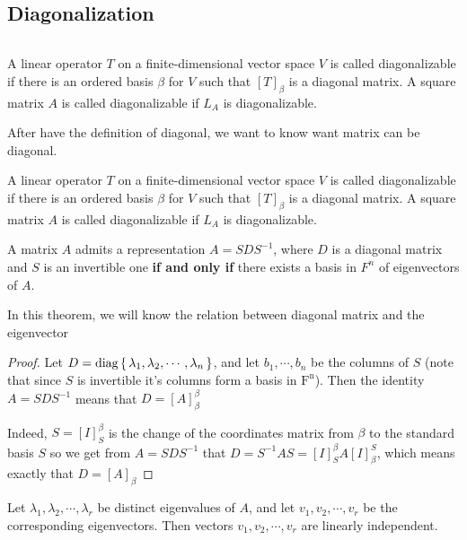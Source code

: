 \subsection{Diagonalization} $ $

\begin{defn}
	A linear operator $T$ on a finite-dimensional vector space $V$ is called diagonalizable if there is an ordered basis $\beta$ for $V$ such that $[T]_\beta$ is a diagonal matrix. A square matrix $A$ is called diagonalizable if $L_A$ is diagonalizable.
\end{defn}

\begin{tcolorbox}
	After have the definition of diagonal, we want to know want matrix can be diagonal.
\end{tcolorbox}



\begin{defn}
	A linear operator $T$ on a finite-dimensional vector space $V$ is called diagonalizable if there is an ordered basis $\beta$ for $V$ such that $[T]_{\beta}$ is a diagonal matrix. A square matrix $A$ is called diagonalizable if $L_A$ is diagonalizable.
\end{defn}

\begin{thm*}
	A matrix $A$ admits a representation $A = SDS^{-1}$, where $D$ is a diagonal matrix and $S$ is an invertible one \textbf{if and only if} there exists a basis in $F^n$ of eigenvectors of $A$.
\end{thm*}

\begin{tcolorbox}
	In this theorem, we will know the relation between diagonal matrix and the eigenvector
\end{tcolorbox}

\begin{proof}
	Let $D = \text{diag}\left\{ \,\lambda_1,\lambda_2,\cdots,\lambda_n \,\right\}$, and let $b_1,\cdots,b_n$ be the columns of $S$ (note that since $S$ is invertible it's columns form a basis in $\mathrm{F^n}$). Then the identity $A = SDS^{-1}$ means that $D = [A]^\beta_\beta$
	
	Indeed, $S = [I]^{\beta}_{S}$ is the change of the coordinates matrix from $\beta$ to the standard basis $S$ so we get from $A = SDS^{-1}$ that $D = S^{-1}AS = [I]^{\beta}_{S}A[I]^{S}_{\beta}$, which means exactly that $D = [A]_{\beta}$
\end{proof}

\begin{thm*}
	Let $\lambda_1,\lambda_2,\cdots,\lambda_r$ be distinct eigenvalues of $A$, and let $v_1,v_2,\cdots,v_r$ be the corresponding eigenvectors. Then vectors $v_1,v_2,\cdots,v_r$ are linearly independent.
\end{thm*}

